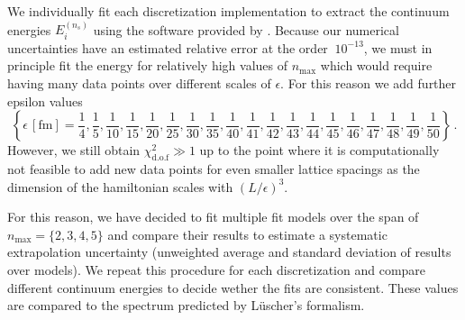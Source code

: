 We individually fit each discretization implementation to extract the continuum energies $E_i^{(n_s)}$ using the software provided by .
Because our numerical uncertainties have an estimated relative error at the order $~10^{-13}$, we must in principle fit the energy for relatively high values of $n_\mathrm{max}$ which would require having many data points over different scales of $\epsilon$.
For this reason we add further epsilon values
\begin{equation}
	\left\{
		\epsilon \, [\mathrm{fm}] =
		\frac{1}{4}, \frac{1}{5}, \frac{1}{10},
		\frac{1}{15}, \frac{1}{20}, \frac{1}{25},
		\frac{1}{ 30}, \frac{1}{ 35}, \frac{1}{ 40},
		\frac{1}{ 41}, \frac{1}{ 42}, \frac{1}{ 43},
		\frac{1}{ 44}, \frac{1}{45}, \frac{1}{ 46},
		\frac{1}{ 47}, \frac{1}{ 48}, \frac{1}{ 49}, \frac{1}{ 50}
	\right\}
	\, .
\end{equation}
However, we still obtain $\chi^2_{\mathrm{d.o.f}} \gg 1$ up to the point where it is computationally not feasible to add new data points for even smaller lattice spacings as the dimension of the hamiltonian scales with $(L/\epsilon)^3$.

For this reason, we have decided to fit multiple fit models over the span of $n_\mathrm{max} = \{2, 3, 4, 5\}$ and compare their results to estimate a systematic extrapolation uncertainty (unweighted average and standard deviation of results over models).
We repeat this procedure for each discretization and compare different continuum energies to decide wether the fits are consistent.
These values are compared to the spectrum predicted by L\"uscher's formalism.

